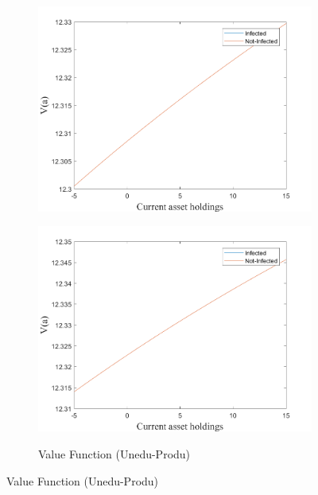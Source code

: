 \begin{figure}[H]
\begin{subfigure}{0.5\textwidth}
   \includegraphics[width=\linewidth,height = 0.22\textheight]{figures/pre/FIG15.png}
    \label{fig_dert}
\end{subfigure}
\hspace*{\fill}
\begin{subfigure}{0.5\textwidth}\caption{Value Function (Unedu-Produ)}
   \includegraphics[width=\linewidth,height = 0.22\textheight]{figures/pre/FIG16.png}
    \label{fig:x_b}
\end{subfigure}
\hspace*{\fill}
\label{lafigura_aux}
\end{figure}
\newpage

